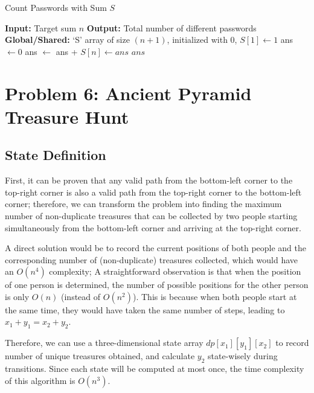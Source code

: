 \documentclass[11pt, a4paper, oneside]{memoir}
\begin{document}
\begin{algorithm}[H]
    \caption{Count Passwords with Sum $S$}
    \label{alg:count_passwords}
    \begin{algorithmic}[1]
        \State \textbf{Input:} Target sum $n$
        \State \textbf{Output:} Total number of different passwords
        \State \textbf{Global/Shared:} `S' array of size $(n+1)$, initialized with $0$, $S[1] \gets 1$
        \State {} 
        \EndIf
        \State {} 
        \EndIf
        \State ans $\gets 0$
        \State ans $\gets$ ans + 
        \EndFor
        \State $S[n] \gets ans$ 
        \State \Return $ans$
        \EndFunction
    \end{algorithmic}
\end{algorithm}

\chapter{Problem 6: Ancient Pyramid Treasure Hunt}
\section{State Definition}
First, it can be proven that any valid path from the bottom-left corner to the top-right corner
is also a valid path from the top-right corner to the bottom-left corner;
therefore, we can transform the problem into finding the maximum number of non-duplicate treasures
that can be collected by two people starting simultaneously from the bottom-left corner and arriving at the top-right corner.

A direct solution would be to record the current positions of both people and the corresponding number of (non-duplicate) treasures collected,
which would have an $O(n^4)$ complexity; A straightforward observation is that when the position of one person is determined,
the number of possible positions for the other person is only $O(n)$ (instead of $O(n^2)$).
This is because when both people start at the same time, they would have taken the same number of steps, leading to $x_1+y_1=x_2+y_2$.

Therefore, we can use a three-dimensional state array $dp[x_1][y_1][x_2]$ to record number of unique treasures obtained, and calculate $y_2$ state-wisely during transitions.
Since each state will be computed at most once, the time complexity of this algorithm is $O(n^3)$.
\end{document}

